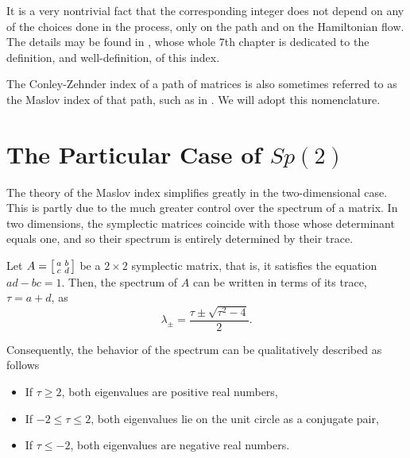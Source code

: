 It is a very nontrivial fact that the corresponding integer does not depend on any of the choices done in the process, only on the path and on the Hamiltonian flow. The details may be found in \cite{audin}, whose whole 7th chapter is dedicated to the definition, and well-definition, of this index.

The Conley-Zehnder index of a path of matrices is also sometimes referred to as the Maslov index of that path, such as in \cite{audin}. We will adopt this nomenclature.

\section{The Particular Case of \texorpdfstring{$Sp(2)$}{Sp(2)}}\label{sec:maslovsp2}

The theory of the Maslov index simplifies greatly in the two-dimensional case. This is partly due to the much greater control over the spectrum of a matrix. In two dimensions, the symplectic matrices coincide with those whose determinant equals one, and so their spectrum is entirely determined by their trace.

\begin{prop}
Let $A = \mleft[\begin{smallmatrix} a & b \\ c & d \end{smallmatrix}\mright]$ be a $2 \times 2$ symplectic matrix, that is, it satisfies the equation $ad - bc = 1$. Then, the spectrum of $A$ can be written in terms of its trace, $\tau = a+d$, as
\begin{equation}\label{lambdafromtau}
\lambda_\pm = \frac{\tau \pm \sqrt{\tau^2 - 4}}2.
\end{equation}

Consequently, the behavior of the spectrum can be qualitatively described as follows
\begin{itemize}
\item If $\tau \geq 2$, both eigenvalues are positive real numbers,
\item If $-2 \leq \tau \leq 2$, both eigenvalues lie on the unit circle as a conjugate pair,
\item If $\tau \leq -2$, both eigenvalues are negative real numbers.
\end{itemize}
\end{prop}

